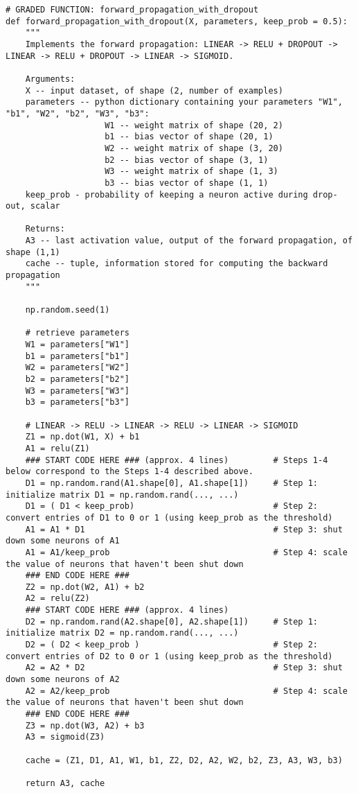 \begin{verbatim}
# GRADED FUNCTION: forward_propagation_with_dropout
def forward_propagation_with_dropout(X, parameters, keep_prob = 0.5):
    """
    Implements the forward propagation: LINEAR -> RELU + DROPOUT -> LINEAR -> RELU + DROPOUT -> LINEAR -> SIGMOID.
    
    Arguments:
    X -- input dataset, of shape (2, number of examples)
    parameters -- python dictionary containing your parameters "W1", "b1", "W2", "b2", "W3", "b3":
                    W1 -- weight matrix of shape (20, 2)
                    b1 -- bias vector of shape (20, 1)
                    W2 -- weight matrix of shape (3, 20)
                    b2 -- bias vector of shape (3, 1)
                    W3 -- weight matrix of shape (1, 3)
                    b3 -- bias vector of shape (1, 1)
    keep_prob - probability of keeping a neuron active during drop-out, scalar
    
    Returns:
    A3 -- last activation value, output of the forward propagation, of shape (1,1)
    cache -- tuple, information stored for computing the backward propagation
    """
    
    np.random.seed(1)
    
    # retrieve parameters
    W1 = parameters["W1"]
    b1 = parameters["b1"]
    W2 = parameters["W2"]
    b2 = parameters["b2"]
    W3 = parameters["W3"]
    b3 = parameters["b3"]
    
    # LINEAR -> RELU -> LINEAR -> RELU -> LINEAR -> SIGMOID
    Z1 = np.dot(W1, X) + b1
    A1 = relu(Z1)
    ### START CODE HERE ### (approx. 4 lines)         # Steps 1-4 below correspond to the Steps 1-4 described above. 
    D1 = np.random.rand(A1.shape[0], A1.shape[1])     # Step 1: initialize matrix D1 = np.random.rand(..., ...)
    D1 = ( D1 < keep_prob)                            # Step 2: convert entries of D1 to 0 or 1 (using keep_prob as the threshold)
    A1 = A1 * D1                                      # Step 3: shut down some neurons of A1
    A1 = A1/keep_prob                                 # Step 4: scale the value of neurons that haven't been shut down
    ### END CODE HERE ###
    Z2 = np.dot(W2, A1) + b2
    A2 = relu(Z2)
    ### START CODE HERE ### (approx. 4 lines)
    D2 = np.random.rand(A2.shape[0], A2.shape[1])     # Step 1: initialize matrix D2 = np.random.rand(..., ...)
    D2 = ( D2 < keep_prob )                           # Step 2: convert entries of D2 to 0 or 1 (using keep_prob as the threshold)
    A2 = A2 * D2                                      # Step 3: shut down some neurons of A2
    A2 = A2/keep_prob                                 # Step 4: scale the value of neurons that haven't been shut down
    ### END CODE HERE ###
    Z3 = np.dot(W3, A2) + b3
    A3 = sigmoid(Z3)
    
    cache = (Z1, D1, A1, W1, b1, Z2, D2, A2, W2, b2, Z3, A3, W3, b3)
    
    return A3, cache
\end{verbatim}


